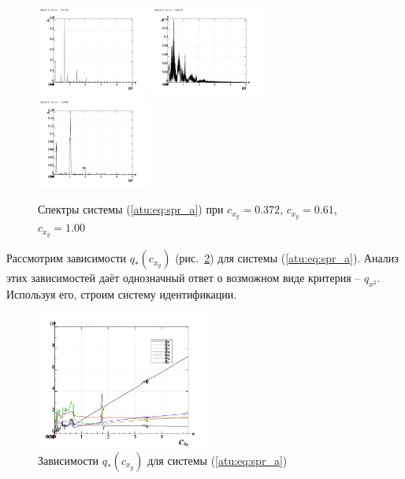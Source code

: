 \begin{figure}[htb!]
\centerline{
  \includegraphics[width=0.33\textwidth]{p/cha/spr_a/sprott_a_f-p_f_cx_y=0x372.png}
  \includegraphics[width=0.33\textwidth]{p/cha/spr_a/sprott_a_f-p_f_cx_y=0x610.png}
  \includegraphics[width=0.33\textwidth]{p/cha/spr_a/sprott_a_f-p_f_cx_y=1x000.png}
}
\caption{Спектры системы (\ref{atu:eq:spr_a})
  при $ c_{x_y} =0.372 $, $ c_{x_y} =0.61 $, $ c_{x_y} =1.00 $
}
\label{atu:f:spr_a_f}
\end{figure}

Рассмотрим зависимости $q_{*}(c_{x_y}) $ (рис.~\ref{atu:f:spr_a_q})
для системы (\ref{atu:eq:spr_a}). Анализ этих зависимостей
даёт однозначный ответ о возможном виде критерия -- $q_{x^2}$.
Используя его, строим систему идентификации.

\begin{figure}[htb!]
\centerline{
  \includegraphics[width=0.50\textwidth]{p/cha/spr_a/sprott_a_p-p_c_x_y.png}
}
\caption{Зависимости $q_{*}(c_{x_y})$ для системы (\ref{atu:eq:spr_a}) }
\label{atu:f:spr_a_q}
\end{figure}


